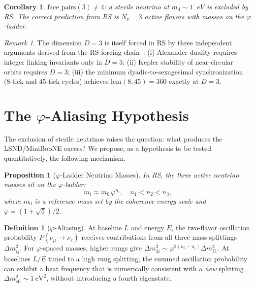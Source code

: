 \documentclass[12pt,a4paper]{article}
\newtheorem{corollary}[theorem]{Corollary}
\newtheorem{proposition}[theorem]{Proposition}
\theoremstyle{definition}
\newtheorem{definition}[theorem]{Definition}
\theoremstyle{remark}
\newtheorem{remark}[theorem]{Remark}
\begin{document}
\begin{corollary}
$\mathrm{face\_pairs}(3) \neq 4$: a sterile neutrino at $m_4 \sim 1$~eV
is excluded by RS.  The correct prediction from RS is $N_\nu = 3$
active flavors with masses on the $\varphi$-ladder.
\end{corollary}

\begin{remark}
The dimension $D = 3$ is itself forced in RS by three independent
arguments derived from the RS forcing chain~\cite{RS_Axioms}: (i)
Alexander duality requires integer linking invariants only in $D = 3$;
(ii) Kepler stability of near-circular orbits requires $D = 3$;
(iii) the minimum dyadic-to-sexagesimal synchronization (8-tick and
45-tick cycles) achieves $\mathrm{lcm}(8, 45) = 360$ exactly at $D = 3$.
\end{remark}

\section{The $\varphi$-Aliasing Hypothesis}
\label{sec:aliasing}

The exclusion of sterile neutrinos raises the question: what produces
the LSND/MiniBooNE excess?  We propose, as a hypothesis to be tested
quantitatively, the following mechanism.

\begin{proposition}[$\varphi$-Ladder Neutrino Masses]
\label{prop:nu-masses}
In RS, the three active neutrino masses sit on the $\varphi$-ladder:
\begin{equation}
  m_i \approx m_0 \, \varphi^{n_i}, \quad n_1 < n_2 < n_3,
\end{equation}
where $m_0$ is a reference mass set by the coherence energy scale and
$\varphi = (1+\sqrt{5})/2$.
\end{proposition}

\begin{definition}[$\varphi$-Aliasing]
\label{def:aliasing}
At baseline $L$ and energy $E$, the two-flavor oscillation probability
$P(\nu_\mu \to \nu_e)$ receives contributions from all three mass
splittings $\Delta m^2_{ij}$.  For $\varphi$-spaced masses, higher
rungs give $\Delta m^2_{3i} \sim \varphi^{2(n_3 - n_i)} \Delta
m^2_{21}$.  At baselines $L/E$ tuned to a high rung splitting, the
summed oscillation probability can exhibit a beat frequency that
is numerically consistent with a \emph{new} splitting $\Delta
m^2_{\mathrm{eff}} \sim 1~\mathrm{eV}^2$, without introducing a fourth
eigenstate.
\end{definition}
\end{document}

